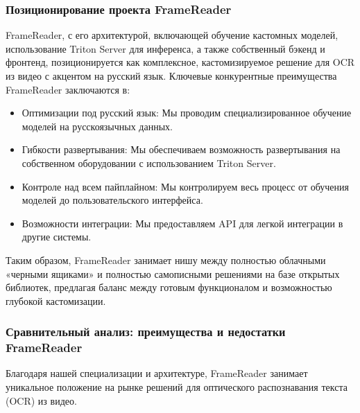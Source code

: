 \documentclass[12pt, a4paper]{article}
\theoremstyle{definition}
\theoremstyle{remark}
\begin{document}
	\subsubsection{Позиционирование проекта FrameReader}
	FrameReader, с его архитектурой, включающей обучение кастомных моделей, использование Triton Server для инференса, а также собственный бэкенд и фронтенд, позиционируется как комплексное, кастомизируемое решение для OCR из видео с акцентом на русский язык. Ключевые конкурентные преимущества FrameReader заключаются в:
	\begin{itemize}
		\item Оптимизации под русский язык: Мы проводим специализированное обучение моделей на русскоязычных данных.
		\item Гибкости развертывания: Мы обеспечиваем возможность развертывания на собственном оборудовании с использованием Triton Server.
		\item Контроле над всем пайплайном: Мы контролируем весь процесс от обучения моделей до пользовательского интерфейса.
		\item Возможности интеграции: Мы предоставляем API для легкой интеграции в другие системы.
	\end{itemize}
	Таким образом, FrameReader занимает нишу между полностью облачными «черными ящиками» и полностью самописными решениями на базе открытых библиотек, предлагая баланс между готовым функционалом и возможностью глубокой кастомизации.
	
	\subsubsection{Сравнительный анализ: преимущества и недостатки FrameReader}
	Благодаря нашей специализации и архитектуре, FrameReader занимает уникальное положение на рынке решений для оптического распознавания текста (OCR) из видео.
	
\end{document}
